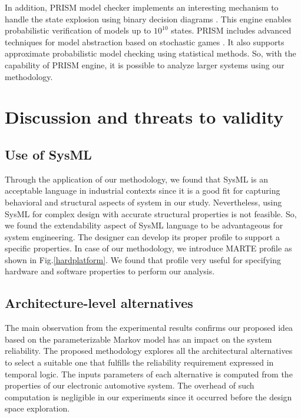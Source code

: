 \documentclass[3p,times,procedia,authoryear,round]{elsarticle}
\begin{document}
In addition, PRISM model checker implements an interesting mechanism to handle the state explosion using binary decision diagrams \citep{KP12}. This engine enables probabilistic verification of models up to $10^{10}$ states. PRISM includes advanced techniques for model abstraction based on stochastic games \citep{Kwiatkowska2009}. It also supports approximate probabilistic model checking using statistical methods. So, with the capability of PRISM engine, it is possible to analyze larger systems using our methodology.

\section{Discussion and threats to validity}
\label{section9}


\subsection{Use of SysML}
Through the application of  our methodology, we found that SysML is an acceptable language in industrial contexts since it is a good fit for capturing behavioral and structural aspects of system in our study. Nevertheless, using SysML for complex design with accurate structural properties is not feasible. So, we found the extendability aspect of SysML language to be advantageous for system engineering. The designer can develop its proper profile to support a specific properties. In case of our methodology, we introduce MARTE profile as shown in Fig.\ref{hardplatform}. We found that profile very useful for specifying hardware and software  properties to perform our analysis.

\subsection{Architecture-level alternatives}
The main observation from the experimental results confirms our proposed idea based on the   parameterizable Markov model \citep{Filieri2016} has an impact on the system reliability. The proposed methodology explores all the architectural alternatives to select a suitable one that fulfills the reliability requirement expressed in temporal logic. The inputs parameters of each alternative is computed from the properties of our electronic automotive system. The overhead of such computation is negligible in our experiments since it occurred before the design space exploration.
\end{document}
